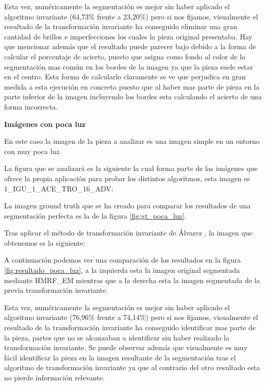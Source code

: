Esta vez, numéricamente la segmentación es mejor sin haber aplicado el algoritmo invariante (64,73\% frente a 23,20\%) pero si nos fijamos, visualmente el resultado de la transformación invariante ha conseguido eliminar una gran cantidad de brillos e imperfecciones los cuales la pieza original presentaba. Hay que mencionar además que el resultado puede parecer bajo debido a la forma de calcular el porcentaje de acierto, puesto que asigna como fondo al color de la segmentación mas común en los bordes de la imagen ya que la pieza suele estar en el centro. Esta forma de calcularlo claramente se ve que perjudica en gran medida a esta ejecución en concreto puesto que al haber mas parte de pieza en la parte inferior de la imagen incluyendo los bordes esta calculando el acierto de una forma incorrecta.

\textbf{Imágenes con poca luz}

En este caso la imagen de la pieza a analizar es una imagen simple en un entorno con muy poca luz.

La figura que se analizará es la siguiente la cual forma parte de las imágenes que ofrece la propia aplicación para probar los distintos algoritmos, esta imagen es 1\_IGU\_1\_ACE\_TRO\_16\_ADV:


La imagen ground truth que se ha creado para comparar los resultados de una segmentación perfecta es la de la figura \ref{fig:gt_poca_luz}.


Tras aplicar el método de transformación invariante de Álvarez \cite{alvarez2011}, la imagen que obtenemos es la siguiente:


A continuación podemos ver una comparación de los resultados en la figura \ref{fig:resultado_poca_luz}, a la izquierda esta la imagen original segmentada mediante HMRF\_EM mientras que a la derecha esta la imagen segmentada de la previa transformación invariante.


Esta vez, numéricamente la segmentación es mejor sin haber aplicado el algoritmo invariante (76,96\% frente a 74,14\%) pero si nos fijamos, visualmente el resultado de la transformación invariante ha conseguido identificar mas parte de la pieza, partes que no se alcanzaban a identificar sin haber realizado la transformación invariante. Se puede observar además que visualmente es muy fácil identificar la pieza en la imagen resultante de la segmentación tras el algoritmo de transformación invariante ya que al contrario del otro resultado esta no pierde información relevante.